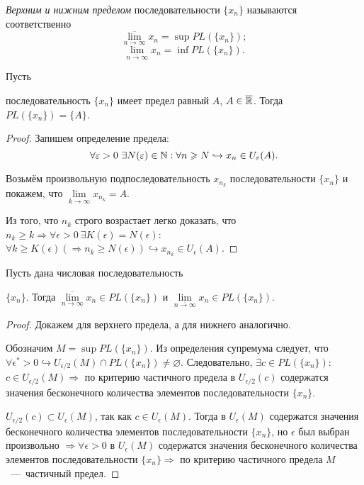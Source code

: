 \begin{definition}
    \textit{Верхним и нижним пределом} последовательности $\{ x_{n} \}$ называются соответственно
    $$ \overline{\lim\limits_{n\to \infty}} x_{n} = \sup PL (\{ x_{n} \});$$
    $$ \lim\limits_{\overline{n\to \infty}} x_{n} = \inf PL (\{ x_{n} \}).$$
\end{definition}
\begin{lemma}
    \hypertarget{lemm2.9}{Пусть} последовательность $\{ x_{n} \}$ имеет предел равный $A$, $A \in \overline{\mathbb{R}}$. Тогда $PL (\{ x_{n} \}) = \{A \}$.
\end{lemma}
\begin{proof}
    Запишем определение предела:
    $$ \forall \varepsilon > 0 \  \exists N (\varepsilon) \in \mathbb{N}: \forall n \geqslant N \hookrightarrow x_{n} \in U_{\varepsilon} (A).$$

    Возьмём произвольную подпоследовательность $x_{n_{k}}$ последовательности $\{ x_{n} \}$ и покажем, что $\lim\limits_{k\to \infty} x_{n_{k}} = A$.

    Из того, что $n_{k}$ строго возрастает легко доказать, что $n_{k} \geq k \Rightarrow \forall \epsilon > 0 \  \exists K (\epsilon) = N (\epsilon)$: $\forall k \geq K (\epsilon) (\Rightarrow n_{k} \geq N (\epsilon)) \hookrightarrow x_{n_{k}} \in U_{\epsilon} (A)$.
\end{proof}
\begin{theorem}
    \hypertarget{thm2.10}{Пусть дана числовая последовательность} $\{ x_{n} \}$. Тогда $\overline{\lim\limits_{n\to \infty}} x_{n} \in PL (\{ x_{n}\})$ и $\lim\limits_{\overline{n\to \infty}} x_{n} \in PL (\{ x_{n} \})$.
\end{theorem}
\begin{proof}
    Докажем для верхнего предела, а для нижнего аналогично.

    Обозначим $M = \sup PL (\{ x_{n} \})$. Из определения супремума следует, что $\forall \epsilon^{*} > 0 \hookrightarrow U_{\epsilon / 2} (M) \cap PL (\{ x_{n} \}) \neq \varnothing.$ Следовательно, $\exists c \in PL (\{ x_{n} \})$: $c \in U_{\epsilon / 2} (M) \Rightarrow$ по критерию частичного предела в $U_{\epsilon / 2} (c)$ содержатся значения бесконечного количества элементов последовательности $\{ x_{n} \}$.

    $U_{\epsilon / 2} (c) \subset U_{\epsilon} (M)$, так как $c \in U_{\epsilon} (M)$. Тогда в $U_{\epsilon} (M)$ содержатся значения бесконечного количества элементов последовательности $\{ x_{n} \}$, но $\epsilon$ был выбран произвольно $\Rightarrow \forall \epsilon > 0$ в $U_{\epsilon} (M)$ содержатся значения бесконечного количества элементов последовательности $\{ x_{n} \} \Rightarrow$ по критерию частичного предела $M$~---~частичный предел.
\end{proof}
